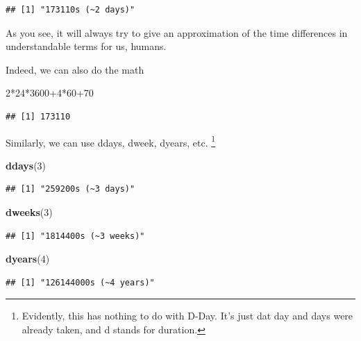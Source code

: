 \documentclass[]{tufte-book}
\newenvironment{Shaded}{}{}
\newcommand{\DecValTok}[1]{\textcolor[rgb]{0.25,0.63,0.44}{#1}}
\newcommand{\KeywordTok}[1]{\textcolor[rgb]{0.00,0.44,0.13}{\textbf{#1}}}
\newcommand{\NormalTok}[1]{#1}
\newcommand{\OperatorTok}[1]{\textcolor[rgb]{0.40,0.40,0.40}{#1}}
\begin{document}
\begin{verbatim}
## [1] "173110s (~2 days)"
\end{verbatim}

As you see, it will always try to give an approximation of the time differences in understandable terms for us, humans.

Indeed, we can also do the math

\begin{Shaded}
\begin{Highlighting}[]
\DecValTok{2}\OperatorTok{*}\DecValTok{24}\OperatorTok{*}\DecValTok{3600}\OperatorTok{+}\DecValTok{4}\OperatorTok{*}\DecValTok{60}\OperatorTok{+}\DecValTok{70}
\end{Highlighting}
\end{Shaded}

\begin{verbatim}
## [1] 173110
\end{verbatim}

Similarly, we can use ddays, dweek, dyears, etc. \footnote{Evidently, this has nothing to do with D-Day. It's just dat day and days were already taken, and d stands for duration.}

\begin{Shaded}
\begin{Highlighting}[]
\KeywordTok{ddays}\NormalTok{(}\DecValTok{3}\NormalTok{)}
\end{Highlighting}
\end{Shaded}

\begin{verbatim}
## [1] "259200s (~3 days)"
\end{verbatim}

\begin{Shaded}
\begin{Highlighting}[]
\KeywordTok{dweeks}\NormalTok{(}\DecValTok{3}\NormalTok{)}
\end{Highlighting}
\end{Shaded}

\begin{verbatim}
## [1] "1814400s (~3 weeks)"
\end{verbatim}

\begin{Shaded}
\begin{Highlighting}[]
\KeywordTok{dyears}\NormalTok{(}\DecValTok{4}\NormalTok{)}
\end{Highlighting}
\end{Shaded}

\begin{verbatim}
## [1] "126144000s (~4 years)"
\end{verbatim}
\end{document}
